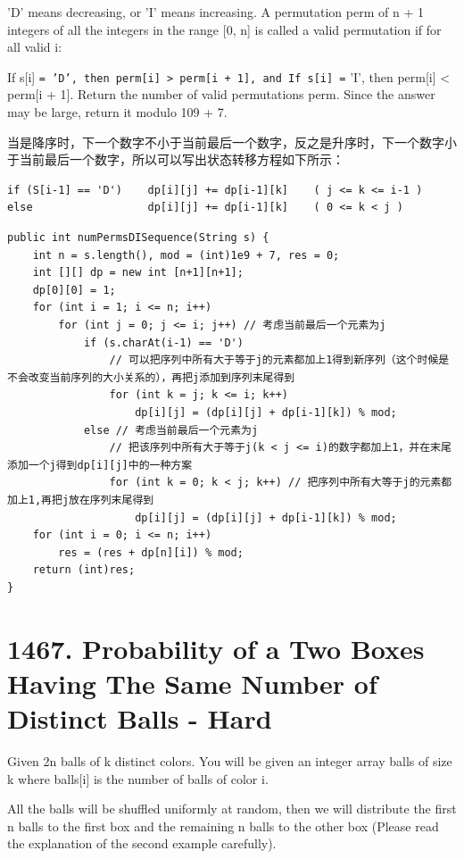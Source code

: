 \documentclass[9pt, b5paaper]{book}
\begin{document}
'D' means decreasing, or
'I' means increasing.
A permutation perm of n + 1 integers of all the integers in the range [0, n] is called a valid permutation if for all valid i:

If s[i] \texttt{= 'D', then perm[i] > perm[i + 1], and
If s[i] =} 'I', then perm[i] < perm[i + 1].
Return the number of valid permutations perm. Since the answer may be large, return it modulo 109 + 7.

当是降序时，下一个数字不小于当前最后一个数字，反之是升序时，下一个数字小于当前最后一个数字，所以可以写出状态转移方程如下所示：
\begin{verbatim}
if (S[i-1] == 'D')    dp[i][j] += dp[i-1][k]    ( j <= k <= i-1 )
else                  dp[i][j] += dp[i-1][k]    ( 0 <= k < j )
\end{verbatim}
\begin{verbatim}
public int numPermsDISequence(String s) {
    int n = s.length(), mod = (int)1e9 + 7, res = 0;
    int [][] dp = new int [n+1][n+1];
    dp[0][0] = 1;
    for (int i = 1; i <= n; i++) 
        for (int j = 0; j <= i; j++) // 考虑当前最后一个元素为j
            if (s.charAt(i-1) == 'D')
                // 可以把序列中所有大于等于j的元素都加上1得到新序列（这个时候是不会改变当前序列的大小关系的），再把j添加到序列末尾得到
                for (int k = j; k <= i; k++) 
                    dp[i][j] = (dp[i][j] + dp[i-1][k]) % mod;
            else // 考虑当前最后一个元素为j
                // 把该序列中所有大于等于j(k < j <= i)的数字都加上1，并在末尾添加一个j得到dp[i][j]中的一种方案
                for (int k = 0; k < j; k++) // 把序列中所有大等于j的元素都加上1,再把j放在序列末尾得到
                    dp[i][j] = (dp[i][j] + dp[i-1][k]) % mod;
    for (int i = 0; i <= n; i++) 
        res = (res + dp[n][i]) % mod;
    return (int)res;
}
\end{verbatim}

\section{1467. Probability of a Two Boxes Having The Same Number of Distinct Balls - Hard}
\label{sec-5-2}
Given 2n balls of k distinct colors. You will be given an integer array balls of size k where balls[i] is the number of balls of color i. 

All the balls will be shuffled uniformly at random, then we will distribute the first n balls to the first box and the remaining n balls to the other box (Please read the explanation of the second example carefully).
\end{document}
